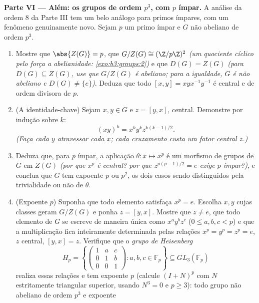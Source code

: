 \begin{problem}
\medskip
\noindent\textbf{Parte VI --- Além: os grupos de ordem $p^3$, com
$p$ ímpar.} A análise da ordem $8$ da Parte III tem um belo
análogo para primos ímpares, com um fenômeno genuinamente novo. Sejam
$p$ um primo ímpar e $G$ não abeliano de ordem $p^3$.
\begin{enumerate}[resume]
  \item Mostre que $\abs{Z(G)} = p$, que $G/Z(G) \cong
        (\Z/p\Z)^2$ \emph{(um quociente cíclico pelo
         força a abelianidade: \cref{exo:b3:groups:2})} e que $D(G) =
        Z(G)$
        \emph{(para $D(G) \subseteq Z(G)$, use que $G/Z(G)$ é abeliano; para a
        igualdade, $G$ é não abeliano e $D(G) \neq \{e\}$)}. Deduza que todo
         $[x, y] = xyx^{-1}y^{-1}$ é central e de ordem divisora de $p$.
  \item (A identidade-chave) Sejam $x, y \in G$ e $z = [y, x]$, central. Demonstre
        por indução sobre $k$:
        \[
        (xy)^k = x^k y^k z^{k(k-1)/2} .
        \]
        \emph{(Faça cada $y$ atravessar cada $x$; cada
        cruzamento custa um fator central $z$.)}
  \item Deduza que, para $p$ ímpar, a aplicação $\theta\colon x \mapsto
        x^p$ é um
        morfismo de grupos de $G$ em $Z(G)$ \emph{(por que
        $x^p$ é central? por que $z^{p(p-1)/2} = e$ exige $p$ ímpar?)}, e
        conclua que $G$ tem expoente $p$ ou $p^2$, os
        dois casos sendo distinguidos pela trivialidade ou não de
        $\theta$.
  \item (Expoente $p$) Suponha que todo elemento satisfaça $x^p = e$.
        Escolha $x, y$ cujas classes geram $G/Z(G)$ e ponha
        $z =
        [y, x]$. Mostre que $z \neq e$, que todo elemento de $G$ se
        escreve de maneira única como $x^ay^bz^c$ ($0 \leq a, b, c < p$) e que a
        multiplicação fica inteiramente determinada pelas relações
        $x^p = y^p = z^p = e$, $z$ central, $[y, x] =
        z$. Verifique que o \emph{grupo
        de Heisenberg}
        \[
        H_p = \left\{
        \begin{pmatrix} 1 & a & c\\ 0 & 1 & b\\ 0 & 0 & 1
        \end{pmatrix} : a, b, c \in \mathbb F_p \right\}
        \subseteq GL_3(\mathbb F_p)
        \]
        realiza essas relações e tem expoente $p$ (calcule $(I + N)^p$
        com $N$ estritamente triangular superior, usando $N^3 = 0$ e
        $p \geq 3$): todo grupo não abeliano de ordem $p^3$ e expoente

\end{enumerate}
\end{problem}
